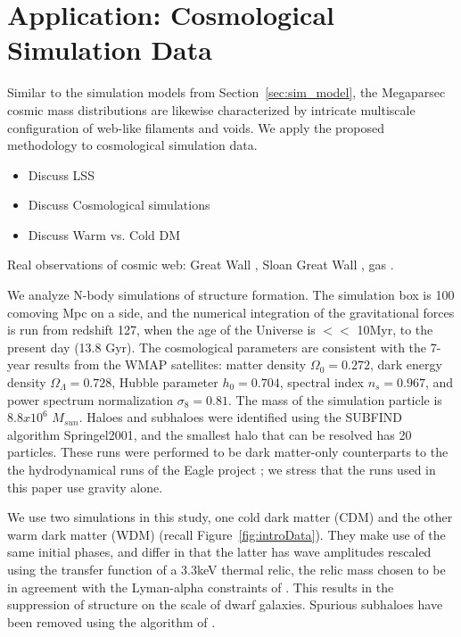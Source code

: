 \documentclass[12pt]{article}
\begin{document}

\section{Application: Cosmological Simulation Data}
\label{sec:application}

Similar to the simulation models from Section~\ref{sec:sim_model}, the Megaparsec cosmic mass distributions are likewise characterized by intricate multiscale configuration of web-like filaments and voids.  We apply the proposed methodology to cosmological simulation data.

\begin{itemize}
\item  Discuss LSS
\item  Discuss Cosmological simulations
\item  Discuss Warm vs. Cold DM
\end{itemize}
Real observations of cosmic web:  Great Wall \cite{geller1989mapping}, Sloan Great Wall \cite{gott2005map}, gas \cite{cantalupo2014cosmic}.

We analyze N-body simulations of structure formation. The simulation box is 100 comoving Mpc on a side, and the numerical integration of the gravitational forces is run from redshift 127, when the age of the Universe is $<<$ 10Myr,  to the present day (13.8 Gyr).  The cosmological parameters are consistent with the 7-year results from the WMAP satellites: matter density $\Omega_0 = 0.272$, dark energy density $\Omega_{\Lambda} = 0.728$, Hubble parameter $h_0 = 0.704$, spectral index $n_s=0.967$, and power spectrum normalization $\sigma_8=0.81$. The mass of the simulation particle is $8.8x10^6$ $M_{sun}$. Haloes and subhaloes were identified using the SUBFIND algorithm {\color{red} Springel2001}, and the smallest halo that can be resolved has 20 particles. These runs were performed to be dark matter-only counterparts to the the hydrodynamical runs of the Eagle project \cite{schaye2015eagle}; we stress that the runs used in this paper use gravity alone. 

We use two simulations in this study, one cold dark matter (CDM) and the other warm dark matter (WDM) (recall Figure~\ref{fig:introData}). They make use of the same initial phases, and differ in that the latter has wave amplitudes rescaled using the transfer function of a 3.3keV thermal relic, the relic mass chosen to be in agreement with the Lyman-alpha constraints of \cite{viel2013warm}. This results in the suppression of structure on the scale of dwarf galaxies. Spurious subhaloes have been removed using the algorithm of \cite{lovell2014properties}.
\end{document}
